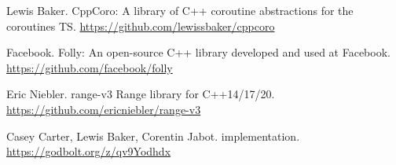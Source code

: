 \documentclass{wg21}
\begin{document}
\begin{thebibliography}{9}
    Lewis Baker.
    CppCoro: A library of C++ coroutine abstractions for the coroutines TS.
    \url{https://github.com/lewissbaker/cppcoro}

    Facebook.
    Folly: An open-source C++ library developed and used at Facebook.
    \url{https://github.com/facebook/folly}

    Eric Niebler.
    range-v3 Range library for C++14/17/20.
    \url{https://github.com/ericniebler/range-v3}

    Casey Carter, Lewis Baker, Corentin Jabot.
     implementation.
    \url{https://godbolt.org/z/qv9Yodhdx}
\end{thebibliography}
\end{document}
